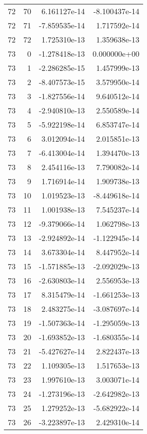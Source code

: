 \begin{tabular}{rrrr}
  72 &   70 &  6.161127e-14 & -8.100437e-14 \\
  72 &   71 & -7.859535e-14 &  1.717592e-14 \\
  72 &   72 &  1.725310e-13 &  1.359638e-13 \\
  73 &    0 & -1.278418e-13 &  0.000000e+00 \\
  73 &    1 & -2.286285e-15 &  1.457999e-13 \\
  73 &    2 & -8.407573e-15 &  3.579950e-14 \\
  73 &    3 & -1.827556e-14 &  9.640512e-14 \\
  73 &    4 & -2.940810e-13 &  2.550589e-14 \\
  73 &    5 & -5.922198e-14 &  6.853747e-14 \\
  73 &    6 &  3.012094e-14 &  2.015851e-13 \\
  73 &    7 & -6.413004e-14 &  1.394470e-13 \\
  73 &    8 &  2.454116e-13 &  7.790082e-14 \\
  73 &    9 &  1.716914e-14 &  1.909738e-13 \\
  73 &   10 &  1.019523e-13 & -8.449618e-14 \\
  73 &   11 &  1.001938e-13 &  7.545237e-14 \\
  73 &   12 & -9.379066e-14 &  1.062798e-13 \\
  73 &   13 & -2.924892e-14 & -1.122945e-14 \\
  73 &   14 &  3.673304e-14 &  8.447952e-14 \\
  73 &   15 & -1.571885e-13 & -2.092029e-13 \\
  73 &   16 & -2.630803e-14 &  2.556953e-13 \\
  73 &   17 &  8.315479e-14 & -1.661253e-13 \\
  73 &   18 &  2.483275e-14 & -3.087697e-14 \\
  73 &   19 & -1.507363e-14 & -1.295059e-13 \\
  73 &   20 & -1.693852e-13 & -1.680355e-14 \\
  73 &   21 & -5.427627e-14 &  2.822437e-13 \\
  73 &   22 &  1.109305e-13 &  1.517653e-13 \\
  73 &   23 &  1.997610e-13 &  3.003071e-14 \\
  73 &   24 & -1.273196e-13 & -2.642982e-13 \\
  73 &   25 &  1.279252e-13 & -5.682922e-14 \\
  73 &   26 & -3.223897e-13 &  2.429310e-14 \\

\end{tabular}
